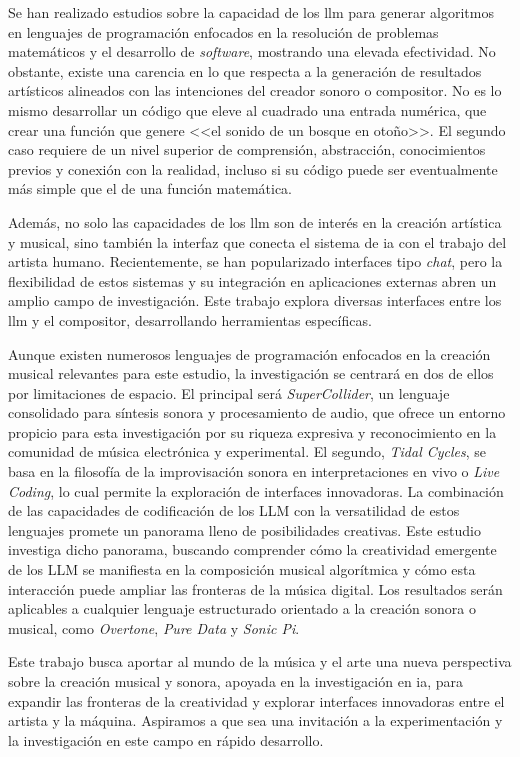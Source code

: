 Se han realizado estudios sobre la capacidad de los \gls{llm} para generar algoritmos en lenguajes de programación enfocados en la resolución de problemas matemáticos y el desarrollo de \textit{software}, mostrando una elevada efectividad. No obstante, existe una carencia en lo que respecta a la generación de resultados artísticos alineados con las intenciones del creador sonoro o compositor. No es lo mismo desarrollar un código que eleve al cuadrado una entrada numérica, que crear una función que genere <<el sonido de un bosque en otoño>>. El segundo caso requiere de un nivel superior de comprensión, abstracción, conocimientos previos y conexión con la realidad, incluso si su código puede ser eventualmente más simple que el de una función matemática.

Además, no solo las capacidades de los \gls{llm} son de interés en la creación artística y musical, sino también la interfaz que conecta el sistema de \gls{ia} con el trabajo del artista humano. Recientemente, se han popularizado interfaces tipo \textit{chat}, pero la flexibilidad de estos sistemas y su integración en aplicaciones externas abren un amplio campo de investigación. Este trabajo explora diversas interfaces entre los \gls{llm} y el compositor, desarrollando herramientas específicas.

Aunque existen numerosos lenguajes de programación enfocados en la creación musical relevantes para este estudio, la investigación se centrará en dos de ellos por limitaciones de espacio. El principal será \textit{SuperCollider}, un lenguaje consolidado para síntesis sonora y procesamiento de audio, que ofrece un entorno propicio para esta investigación por su riqueza expresiva y reconocimiento en la comunidad de música electrónica y experimental. El segundo, \textit{Tidal Cycles}, se basa en la filosofía de la improvisación sonora en interpretaciones en vivo o \textit{Live Coding}, lo cual permite la exploración de interfaces innovadoras. La combinación de las capacidades de codificación de los LLM con la versatilidad de estos lenguajes promete un panorama lleno de posibilidades creativas. Este estudio investiga dicho panorama, buscando comprender cómo la creatividad emergente de los LLM se manifiesta en la composición musical algorítmica y cómo esta interacción puede ampliar las fronteras de la música digital. Los resultados serán aplicables a cualquier lenguaje estructurado orientado a la creación sonora o musical, como \textit{Overtone}, \textit{Pure Data} y \textit{Sonic Pi}.

Este trabajo busca aportar al mundo de la música y el arte una nueva perspectiva sobre la creación musical y sonora, apoyada en la investigación en \gls{ia}, para expandir las fronteras de la creatividad y explorar interfaces innovadoras entre el artista y la máquina. Aspiramos a que sea una invitación a la experimentación y la investigación en este campo en rápido desarrollo.

